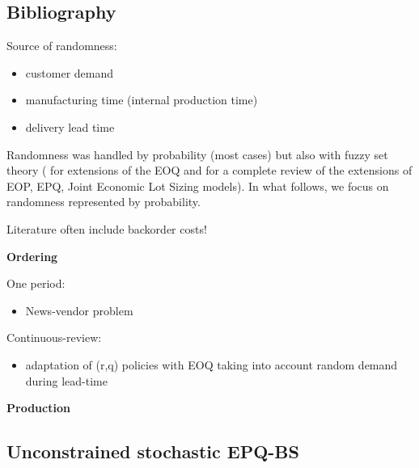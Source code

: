 \subsection{Bibliography}

Source of randomness:
\begin{itemize}
  \item customer demand
  \item manufacturing time (internal production time)
  \item delivery lead time
\end{itemize}

Randomness was handled by probability (most cases) but also with fuzzy set theory (\eg \cite{Park1987,Lee1999,Wang2007} for extensions of the EOQ and \cite{Ziukov2015} for a complete review of the extensions of EOP, EPQ, Joint Economic Lot Sizing models).
In what follows, we focus on randomness represented by probability.

Literature often include backorder costs!

\medskip

\textbf{Ordering}

One period:
\begin{itemize}
  \item News-vendor problem \cite{Edgeworth88,Arrow1951}
\end{itemize}

Continuous-review:
\begin{itemize}
  \item adaptation of (r,q) policies with EOQ taking into account random demand during lead-time \cite{Gallego1998}
\end{itemize}

\medskip

\textbf{Production}







\subsection{Unconstrained stochastic EPQ-BS}


